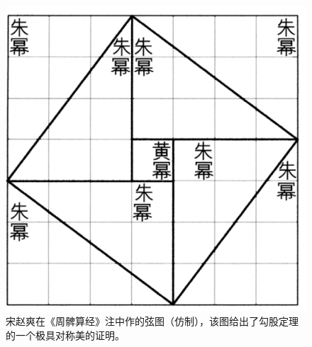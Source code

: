 \documentclass[UTF8] {ctexart}
\begin{document}
\begin{figure}[ht]  %
    \centering  %
    \includegraphics[scale=0.6]{image_xiantu.png}
    \caption{\kaishu 宋赵爽在《周髀算经》注中作的弦图（仿制），该图给出了勾股定理的一个极具对称美的证明\cite{quanjing}。} %
    \label{fig:xiantu}  %
\end{figure}
\end{document}
